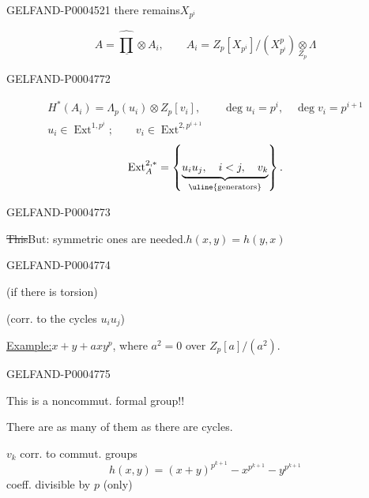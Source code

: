 \begin{GelfandAdjacentEvidence}{GELFAND-P000452}{1}
there remains\quad $X_{p^i}$

\[
\underline{A=\widehat{\prod}\otimes A_i},\qquad
A_i=Z_p[X_{p^i}]/(X_{p^i}^p)\underset{Z_p}{\otimes}\Lambda
\]
\end{GelfandAdjacentEvidence}
\begin{GelfandAdjacentEvidence}{GELFAND-P000477}{2}


\[
\begin{gathered}
H^*(A_i)=\Lambda_p(u_i)\otimes Z_p[v_i],\qquad
\deg u_i=p^i,\quad\deg v_i=p^{i+1}\\
u_i\in\operatorname{Ext}^{1,p^i};\qquad
v_i\in\operatorname{Ext}^{2,p^{i+1}}
\end{gathered}
\]
\[
\operatorname{Ext}_A^{2,*}=
\left\{\underbrace{u_i u_j,\quad i<j,\quad v_k}_{\text{\uline{generators}}}\right\}.
\]
\end{GelfandAdjacentEvidence}
\begin{GelfandAdjacentEvidence}{GELFAND-P000477}{3}


\sout{This}\quad But:
symmetric ones are needed.\quad \uline{\mbox{$h(x,y)=h(y,x)$}}
\end{GelfandAdjacentEvidence}
\begin{GelfandAdjacentEvidence}{GELFAND-P000477}{4}


\qquad (if there is torsion)

(corr. to the cycles $u_i u_j$)

\uline{Example:}\quad $x+y+axy^p$, where $a^2=0$ \quad
over $Z_p[a]/(a^2)$.
\end{GelfandAdjacentEvidence}
\begin{GelfandAdjacentEvidence}{GELFAND-P000477}{5}

This is a noncommut. formal group!!

There are as many of them as there are cycles.

$v_k$ corr. to commut. groups
\[
h(x,y)=(x+y)^{p^{k+1}}-x^{p^{k+1}}-y^{p^{k+1}}
\]
coeff. divisible by $p$ (only)
\end{GelfandAdjacentEvidence}
